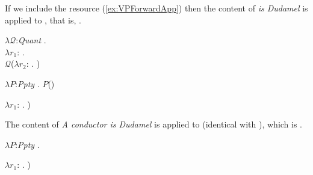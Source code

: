 If we include the resource (\ref{ex:VPForwardApp}) then the
content of \textit{is Dudamel} is  applied to ,
that is, .
\begin{ex} 
\begin{subex} 
 
\item $\lambda\mathcal{Q}$:\textit{Quant} . \\
\hspace*{1em} $\lambda r_1$:
. \\
\hspace*{2em} $\mathcal{Q}$($\lambda
r_2$:
. )  
 
\item $\lambda P$:\textit{Ppty} . $P$()

\item  $\lambda r_1$:
. )
 
\end{subex} 
   
\end{ex}
The content of \textit{A conductor is Dudamel} is  applied
to  (identical with ), which is .
\begin{ex} 
\begin{subex} 
 
\item $\lambda P$:\textit{Ppty}
.  
 
\item $\lambda r_1$:
. )

\item {} 
 
\end{subex} 
   
\end{ex} 

